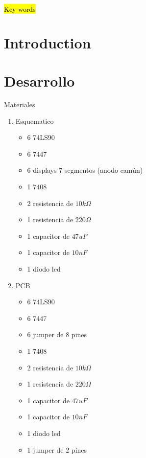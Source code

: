 \documentclass[journal]{IEEEtran}
\begin{document}
\begin{IEEEkeywords}
\hl{Key words}
\end{IEEEkeywords}

\IEEEpeerreviewmaketitle

\section{Introduction}

\section{Desarrollo}
Materiales
\begin{enumerate}
    \item Esquematico
    \begin{itemize}
        \item 6 74LS90
        \item 6 7447
        \item 6 displays 7 segmentos (anodo camún)
        \item 1 7408
        \item 2 resistencia de $10k\Omega$
        \item 1 resistencia de $220\Omega$
        \item 1 capacitor de $47uF$
        \item 1 capacitor de $10nF$
        \item 1 diodo led
    \end{itemize}
    \item PCB
    \begin{itemize}
        \item 6 74LS90
        \item 6 7447
        \item 6 jumper de 8 pines
        \item 1 7408
        \item 2 resistencia de $10k\Omega$
        \item 1 resistencia de $220\Omega$
        \item 1 capacitor de $47uF$
        \item 1 capacitor de $10nF$
        \item 1 diodo led
        \item 1 jumper de 2 pines
    \end{itemize}
\end{enumerate}
\end{document}
